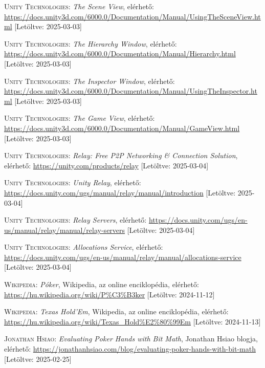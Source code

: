 \documentclass[]{thesis-ekf}
\theoremstyle{definition}
\theoremstyle{remark}
\begin{document}
\begin{thebibliography}{2}
	\textsc{Unity Technologies}: \emph{The Scene View}, elérhető:
	\url{https://docs.unity3d.com/6000.0/Documentation/Manual/UsingTheSceneView.html} [Letöltve: 2025-03-03]
	
	\textsc{Unity Technologies}: \emph{The Hierarchy Window}, elérhető:
	\url{https://docs.unity3d.com/6000.0/Documentation/Manual/Hierarchy.html} [Letöltve: 2025-03-03]
	
	\textsc{Unity Technologies}: \emph{The Inspector Window}, elérhető:
	\url{https://docs.unity3d.com/6000.0/Documentation/Manual/UsingTheInspector.html} [Letöltve: 2025-03-03]
	
	\textsc{Unity Technologies}: \emph{The Game View}, elérhető:
	\url{https://docs.unity3d.com/6000.0/Documentation/Manual/GameView.html} [Letöltve: 2025-03-03]
	
	\textsc{Unity Technologies}: \emph{Relay: Free P2P Networking \& Connection Solution}, elérhető:
	\url{https://unity.com/products/relay} [Letöltve: 2025-03-04]
	
	\textsc{Unity Technologies}: \emph{Unity Relay}, elérhető:
	\url{https://docs.unity.com/ugs/manual/relay/manual/introduction} [Letöltve: 2025-03-04]
	
	\textsc{Unity Technologies}: \emph{Relay Servers}, elérhető:
	\url{https://docs.unity.com/ugs/en-us/manual/relay/manual/relay-servers} [Letöltve: 2025-03-04]
	
	\textsc{Unity Technologies}: \emph{Allocations Service}, elérhető:
	\url{https://docs.unity.com/ugs/en-us/manual/relay/manual/allocations-service} [Letöltve: 2025-03-04]
	
	\textsc{Wikipedia}: \emph{Póker}, Wikipedia, az online enciklopédia, elérhető: \url{https://hu.wikipedia.org/wiki/P%C3%B3ker} [Letöltve: 2024-11-12]
	
	\textsc{Wikipedia}: \emph{Texas Hold'Em}, Wikipedia, az online enciklopédia, elérhető: \url{https://hu.wikipedia.org/wiki/Texas_Hold%E2%80%99Em} [Letöltve: 2024-11-13]
	
	\textsc{Jonathan Hsiao}: \emph{Evaluating Poker Hands with Bit Math}, Jonathan Hsiao blogja, elérhető: \url{https://jonathanhsiao.com/blog/evaluating-poker-hands-with-bit-math} [Letöltve: 2025-02-25]
	

\end{thebibliography}
\end{document}

